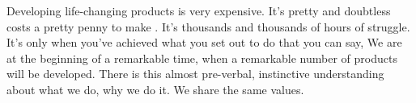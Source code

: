 Developing life-changing products is very expensive.
It's pretty and doubtless costs a pretty penny to make .
It's thousands and thousands of hours of struggle. It's only when you've achieved what you set out to do that you can say,
We are at the beginning of a remarkable time, when a remarkable number of products will be developed. 
There is this almost pre-verbal, instinctive understanding about what we do, why we do it. We share the same values.

